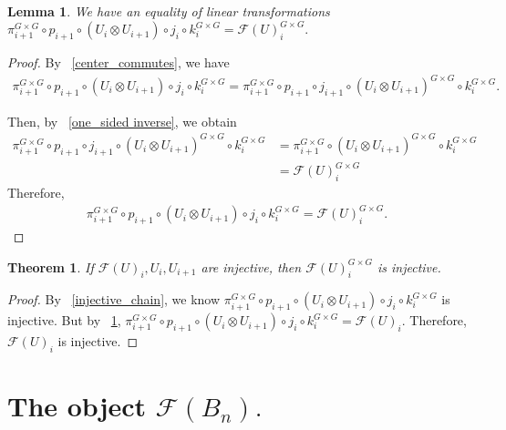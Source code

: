 \documentclass{amsart}
\newtheorem{lem}[subsubsection]{Lemma}
\newtheorem{thm}[subsubsection]{Theorem}
\begin{document}
\begin{lem}
\label{two_equivalent_paths}
We have an equality of linear transformations $\pi^{G\times G}_{i+1}\circ p_{i+1}\circ(U_i\otimes U_{i+1})\circ j_i\circ k^{G\times G}_i = \mathcal F(U)^{G\times G}_i.$
\end{lem}
\begin{proof}
By ~\ref{center_commutes}, we have
\begin{align*}
	\pi^{G\times G}_{i+1}\circ p_{i+1}\circ(U_i\otimes U_{i+1})\circ j_i\circ k^{G\times G}_i = \pi^{G\times G}_{i+1}\circ p_{i+1}\circ j_{i+1}\circ(U_i\otimes U_{i+1})^{G\times G}\circ k^{G\times G}_i.
\end{align*}

Then, by ~\ref{one_sided inverse}, we obtain
\begin{align*}
	\pi^{G\times G}_{i+1}\circ p_{i+1}\circ j_{i+1}\circ(U_i\otimes U_{i+1})^{G\times G}\circ k^{G\times G}_i &= \pi^{G\times G}_{i+1}\circ(U_i\otimes U_{i+1})^{G\times G}\circ k^{G\times G}_i\\
	&= \mathcal F(U)^{G\times G}_i
\end{align*}
Therefore,
\begin{align*}
	\pi^{G\times G}_{i+1}\circ p_{i+1}\circ(U_i\otimes U_{i+1})\circ j_i\circ k^{G\times G}_i = \mathcal F(U)^{G\times G}_i.
\end{align*}
\end{proof}

\begin{thm}
\label{injectivity_thm}
If $\mathcal F(U)_i,U_i,U_{i+1}$ are injective, then $\mathcal F(U)^{G\times G}_i$ is injective.
\end{thm}
\begin{proof}
By ~\ref{injective_chain}, we know $\pi^{G\times G}_{i+1}\circ p_{i+1}\circ(U_i\otimes U_{i+1})\circ j_i\circ k^{G\times G}_i$ is injective. But by ~\ref{two_equivalent_paths}, $\pi^{G\times G}_{i+1}\circ p_{i+1}\circ(U_i\otimes U_{i+1})\circ j_i\circ k^{G\times G}_i = \mathcal F(U)_i.$ Therefore, $\mathcal F(U)_i$ is injective.
\end{proof}

\section{The object $\mathcal F(B_n).$}
\end{document}
